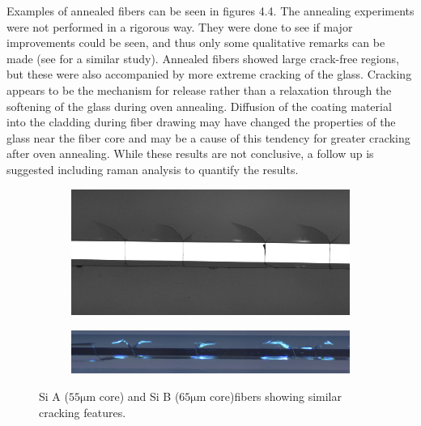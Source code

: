 Examples of annealed fibers can be seen in figures 4.4. The annealing experiments were not performed in a rigorous way. They were done to see if major improvements could be seen, and thus only some qualitative remarks can be made (see \cite{Zhao2018EffectsFiber} for a similar study). Annealed fibers showed large crack-free regions, but these were also accompanied by more extreme cracking of the glass. Cracking appears to be the mechanism for release rather than a relaxation through the softening of the glass during oven annealing. Diffusion of the coating material into the cladding during fiber drawing may have changed the properties of the glass near the fiber core and may be a cause of this tendency for greater cracking after oven annealing. While these results are not conclusive, a follow up is suggested including raman analysis to quantify the results. 



 
\begin{figure}[h]
\centering
\begin{subfigure}{\textwidth}
  \centering
  \includegraphics[width=\linewidth]{fig/polishing/Siedit.jpg}
  
\end{subfigure}%

\begin{subfigure}{\textwidth}
  \centering
  \includegraphics[width=\linewidth]{fig/polishing/e944.jpg}
  
\end{subfigure}%
\caption{Si A ($55 \si{\micro\meter}$ core) and Si B ($65 \si{\micro\meter}$ core)fibers showing similar cracking features. }
\end{figure}

